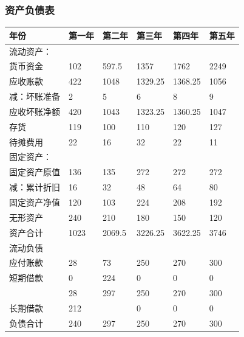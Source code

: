\documentclass[UTF8]{ctexart}
\begin{document}
\subsubsection{资产负债表}
\begin{table}[H]
	\centering
	\begin{tabular}{|l|l|l|l|l|l|}
		\hline
		年份                 & 第一年 & 第二年 & 第三年  & 第四年  & 第五年 \\ \hline
		流动资产：           &        &        &         &         &        \\ \hline
		货币资金             & 102    & 597.5  & 1357    & 1762    & 2249   \\ \hline
		应收账款             & 422    & 1048   & 1329.25 & 1368.25 & 1056   \\ \hline
		减：坏账准备         & 2      & 5      & 6       & 8       & 9      \\ \hline
		应收坏账净额         & 420    & 1043   & 1323.25 & 1360.25 & 1047   \\ \hline
		存货                 & 119    & 100    & 110     & 120     & 127    \\ \hline
		待摊费用             & 22     & 16     & 32      & 22      & 11     \\ \hline

		固定资产：           &        &        &         &         &        \\ \hline
		固定资产原值         & 136    & 135    & 272     & 272     & 272    \\ \hline
		减：累计折旧         & 16     & 32     & 48      & 64      & 80     \\ \hline
		固定资产净值         & 120    & 103    & 224     & 208     & 192    \\ \hline
		无形资产             & 240    & 210    & 180     & 150     & 120    \\ \hline
		资产合计             & 1023   & 2069.5 & 3226.25 & 3622.25 & 3746   \\ \hline

		流动负债             &        &        &         &         &        \\ \hline
		应付账款             & 28     & 73     & 250     & 270     & 300    \\ \hline
		短期借款             & 0      & 224    & 0       & 0       & 0      \\ \hline
		                     & 28     & 297    & 250     & 270     & 300    \\ \hline
		长期借款             & 212    &        & 0       & 0       & 0      \\ \hline
		负债合计             & 240    & 297    & 250     & 270     & 300    \\ \hline


\end{tabular}
\end{table}
\end{document}
